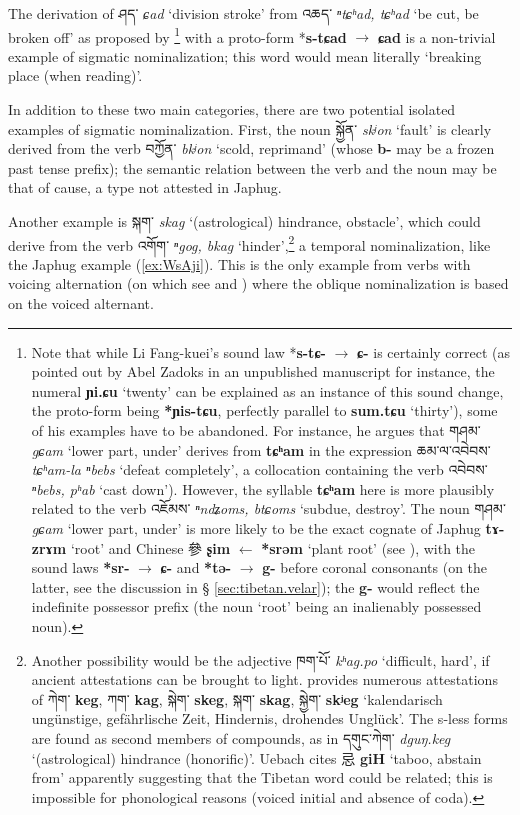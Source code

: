 \documentclass[oneside,a4paper,11pt]{article}
\newcommand{\ipa}[1]{\textbf{{\phon\mbox{#1}}}} %
\newcommand{\zh}[1]{{\cn #1}}
\newcommand{\tibet}[3]{{\tibetain#1} \textit{\phon#2} `#3'}
\newcommand{\tibetan}[1]{{\tibetain#1}}
\newcommand{\zhc}[2]{\zh{#1} \ipa{#2}}
\begin{document}
The derivation of \tibet{ཤད་}{ɕad}{division stroke} from \tibet{འཆད་}{ⁿtɕʰad, tɕʰad}{be cut, be broken off} as proposed by \citet[141]{lifk33}\footnote{Note that while Li Fang-kuei's sound law *\ipa{s-tɕ-} $\rightarrow$ \ipa{ɕ-} is certainly correct (as pointed out by Abel Zadoks in an unpublished manuscript for instance, the numeral \ipa{ɲi.ɕu} `twenty' can be explained as an instance of this sound change, the proto-form being \ipa{*ɲis-tɕu}, perfectly parallel to \ipa{sum.tɕu} `thirty'), some of his examples have to be abandoned. For instance, he argues that \tibet{གཤམ་}{gɕam}{lower part, under} derives from  \ipa{tɕʰam} in the expression \tibet{ཆམ་ལ་འབེབས་}{tɕʰam-la ⁿbebs}{defeat completely}, a collocation containing the verb \tibet{འབེབས་}{ⁿbebs, pʰab}{cast down}). However, the syllable \ipa{tɕʰam} here is more plausibly related to the verb \tibet{འཇོམས་}{ⁿndʑoms, btɕoms}{subdue, destroy}. The noun \tibet{གཤམ་}{gɕam}{lower part, under} is more likely to be the exact cognate of Japhug \ipa{tɤ-zrɤm} `root' and Chinese \zh{參} \ipa{ʂim} $\leftarrow$ \ipa{*srəm} `plant root' (see \citealt{jacques15sr}), with the sound laws \ipa{*sr-} $\rightarrow$ \ipa{ɕ-} and \ipa{*tə-} $\rightarrow$ \ipa{g-} before coronal consonants (on the latter, see the discussion in § \ref{sec:tibetan.velar}); the \ipa{g-} would reflect the indefinite possessor prefix (the noun `root' being an inalienably possessed noun). } with a proto-form *\ipa{s-tɕad} $\rightarrow$ \ipa{ɕad} is a non-trivial example of sigmatic nominalization; this word would mean literally `breaking place (when reading)'.  

In addition to these two main categories, there are two potential isolated examples of sigmatic nominalization. First, the noun \tibet{སྐྱོན་}{skʲon}{fault} is clearly derived from the verb \tibet{བཀྱོན་}{bkʲon}{scold, reprimand} (whose \ipa{b-} may be a frozen past tense prefix); the semantic relation between the verb and the noun may be that of cause, a type not attested in Japhug. 

Another example is \tibet{སྐག་}{skag}{(astrological) hindrance, obstacle}, which could derive from the verb \tibet{འགོག་}{ⁿgog, bkag}{hinder},\footnote{Another possibility would be the adjective \tibet{ཁག་པོ་}{kʰag.po}{difficult, hard}, if ancient attestations can be brought to light. \citet[109]{uebach06woerterbuch02} provides numerous attestations of  \tibetan{ཀེག་} \ipa{keg}, \tibetan{ཀག་} \ipa{kag}, \tibetan{སྐེག་} \ipa{skeg}, \tibetan{སྐག་} \ipa{skag}, \tibetan{སྐྱེག་} \ipa{skʲeg} `kalendarisch ungünstige, gefährlische Zeit, Hindernis, drohendes Unglück'. The s-less forms are found as second members of compounds, as in \tibet{དགུང་ཀེག་}{dguŋ.keg}{(astrological) hindrance (honorific)}. Uebach cites \zhc{忌}{giH} `taboo, abstain from' apparently suggesting that the Tibetan word could be related; this is impossible for phonological reasons (voiced initial and absence of coda). } a temporal nominalization, like the Japhug example (\ref{ex:WsAji}). This is the only example from verbs with voicing alternation (on which see \citealt{jacques12internal} and \citealt{hill14voicing}) where the oblique nominalization is based on the voiced alternant.
\end{document}
